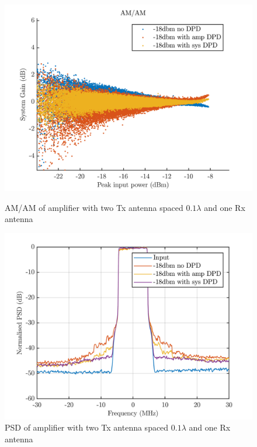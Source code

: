 \begin{figure}[H]
  \centering
  \begin{minipage}[b]{0.5\textwidth}
	\includegraphics[scale = 0.5]{figures/measurement/cree/two/amam_two_ant_0p1.png}
	\caption{AM/AM of amplifier with two Tx antenna spaced $0.1\lambda$ and one Rx antenna}
    \label{fig:cree_amam_one_ant}
  \end{minipage}
  \hfill
  \begin{minipage}[b]{0.4\textwidth}
\includegraphics[scale = 0.5]{figures/measurement/cree/two/psd_two_ant_0p1.png}
\caption{PSD of amplifier with two Tx antenna spaced $0.1\lambda$ and one Rx antenna}
    \label{fig:cree_psd_one_ant}
  \end{minipage}
\end{figure}

